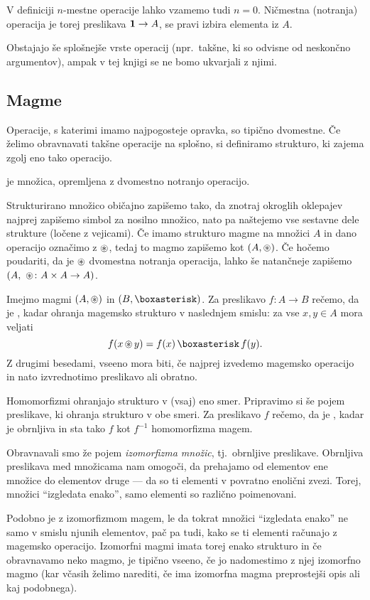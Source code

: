 V definiciji $n$-mestne operacije lahko vzamemo tudi $n = 0$. Ničmestna (notranja) operacija je torej preslikava $\mathtt{\mathbf{1}} \to A$, se pravi izbira elementa iz $A$.

Obstajajo še splošnejše vrste operacij (npr.~takšne, ki so odvisne od neskončno argumentov), ampak v tej knjigi se ne bomo ukvarjali z njimi.


\subsection{Magme}

Operacije, s katerimi imamo najpogosteje opravka, so tipično dvomestne. Če želimo obravnavati takšne operacije na splošno, si definiramo strukturo, ki zajema zgolj eno tako operacijo.

\begin{definicija}
	 je množica, opremljena z dvomestno notranjo operacijo.
\end{definicija}

Strukturirano množico običajno zapišemo tako, da znotraj okroglih oklepajev najprej zapišemo simbol za nosilno množico, nato pa naštejemo vse sestavne dele strukture (ločene z vejicami). Če imamo strukturo magme na množici $A$ in dano operacijo označimo z $\mathop{\circledast}\nolimits$, tedaj to magmo zapišemo kot $(A, \mathop{\circledast}\nolimits)$. Če hočemo poudariti, da je $\mathop{\circledast}\nolimits$ dvomestna notranja operacija, lahko še natančneje zapišemo $(A,\ \mathop{\circledast}\nolimits\colon A \times A \to A)$.

Imejmo magmi $(A, \mathop{\circledast}\nolimits)$ in $(B, \soper)$. Za preslikavo $f\colon A \to B$ rečemo, da je , kadar ohranja magemsko strukturo v naslednjem smislu: za vse $x, y \in A$ mora veljati
\[f(x \oper y) = f(x) \soper f(y).\]
Z drugimi besedami, vseeno mora biti, če najprej izvedemo magemsko operacijo in nato izvrednotimo preslikavo ali obratno.

Homomorfizmi ohranjajo strukturo v (vsaj) eno smer. Pripravimo si še pojem preslikave, ki ohranja strukturo v obe smeri. Za preslikavo $f$ rečemo, da je , kadar je obrnljiva in sta tako $f$ kot $f^{-1}$ homomorfizma magem.

Obravnavali smo že pojem \emph{izomorfizma množic}, tj.~obrnljive preslikave. Obrnljiva preslikava med množicama nam omogoči, da prehajamo od elementov ene množice do elementov druge --- da so ti elementi v povratno enolični zvezi. Torej, množici ``izgledata enako'', samo elementi so različno poimenovani.

Podobno je z izomorfizmom magem, le da tokrat množici ``izgledata enako'' ne samo v smislu njunih elementov, pač pa tudi, kako se ti elementi računajo z magemsko operacijo. Izomorfni magmi imata torej enako strukturo in če obravnavamo neko magmo, je tipično vseeno, če jo nadomestimo z njej izomorfno magmo (kar včasih želimo narediti, če ima izomorfna magma preprostejši opis ali kaj podobnega).

